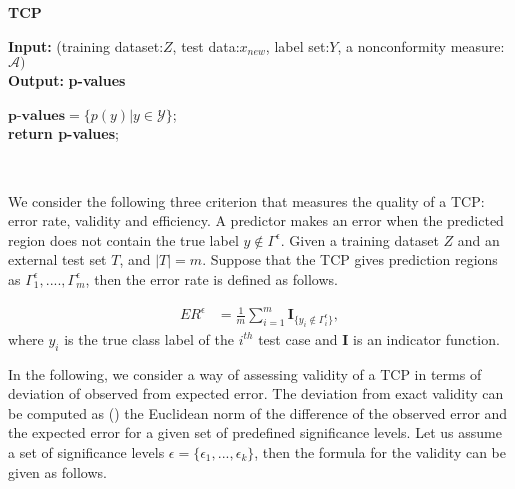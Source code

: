 \documentclass[main]{subfiles}
\begin{document}
\begin{algorithm}[H]
 \caption{\textbf{TCP}} \label{algo:TCP}
 \textbf{Input:}{ (training dataset:$Z$, test data:$x_{new}$, label set:$Y$, a nonconformity measure:$\mathcal{A})$}\\
 \textbf{Output:}{\textbf{ p-values} }\\

 $\textbf{p-values} = \{ p(y)| y \in \mathcal{Y}\}$;\\
 \textbf{return \textbf{p-values}};\\
 \end{algorithm}
 \vspace{10pt}
\textbf{ \\}

 
We consider the following three criterion that measures the quality of a TCP: error rate,
validity and efficiency. A predictor makes an error when the predicted region does not contain the true label $ y \not\in \Gamma^{\epsilon}$. Given a training dataset $Z$ and an external test set $T$,  and $|T| = m$. Suppose that the TCP gives prediction regions as $\Gamma_1^{\epsilon}, ...., \Gamma_m^{\epsilon}$, then the error rate is defined as follows.

\begin{definition}
\begin{align} \label{eq:errorRate}
		ER^{\epsilon} &= \frac{ 1}{m} \sum\limits_{i=1}^{m} \textbf{I}_{ \{y_i \not\in \Gamma_i^{\epsilon} \} },		
\end{align}	
where $y_i$ is the true class label of the $i^{th}$ test case and $\textbf{I}$ is an indicator function. 	
\end{definition}
In the following, we consider a way of assessing validity of a TCP in terms of deviation of observed from expected error. The deviation from exact validity can be computed as (\cite{carlsson2017comparing}) the Euclidean norm of the difference of the observed error and the expected error for a given set of predefined significance levels. Let us assume a set of significance levels $\epsilon = \{ \epsilon_1, ..., \epsilon_k \}$, then the formula for the validity can be given as follows.
\end{document}

